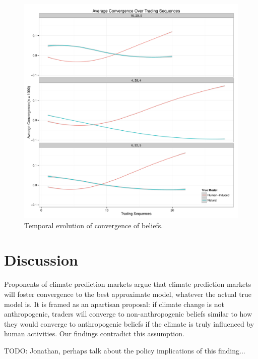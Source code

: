 \documentclass{article}\usepackage[]{graphicx}\usepackage[]{color}
\makeatletter
\def\maxwidth{ %
  \ifdim\Gin@nat@width>\linewidth
    \linewidth
  \else
    \Gin@nat@width
  \fi
}
\newenvironment{knitrout}{}{} %
\makeatother
\begin{document}
\begin{figure}
\centering
\begin{knitrout}
\color{fgcolor}
\includegraphics[width=\maxwidth]{figure/temporal-1} 

\end{knitrout}
\caption{Temporal evolution of convergence of beliefs.}
\label{fig:temporal}
\end{figure}

\section*{Discussion}
Proponents of climate prediction markets argue that climate prediction markets will foster convergence to the best approximate model, whatever the actual true model is. It is framed as an apartisan proposal: if climate change is not anthropogenic, traders will converge to non-anthropogenic beliefs similar to how they would converge to anthropogenic beliefs if the climate is truly influenced by human activities. Our findings contradict this assumption. 

TODO: Jonathan, perhaps talk about the policy implications of this finding...
\end{document}
